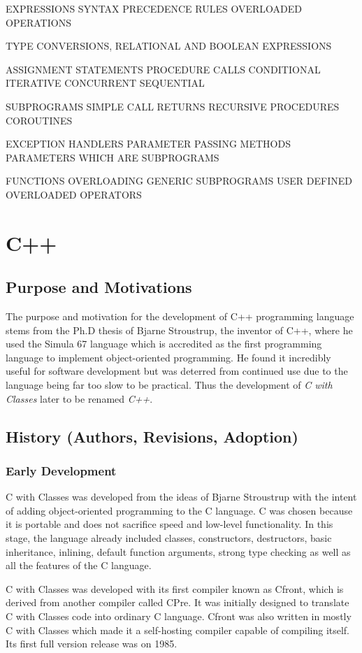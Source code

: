 \documentclass[12pt]{article}
\begin{document}
EXPRESSIONS
SYNTAX
PRECEDENCE RULES
OVERLOADED OPERATIONS

TYPE CONVERSIONS, RELATIONAL AND BOOLEAN EXPRESSIONS

ASSIGNMENT STATEMENTS
PROCEDURE CALLS
CONDITIONAL
ITERATIVE
CONCURRENT
SEQUENTIAL

SUBPROGRAMS
SIMPLE CALL RETURNS
RECURSIVE PROCEDURES
COROUTINES

EXCEPTION HANDLERS
PARAMETER PASSING METHODS
PARAMETERS WHICH ARE SUBPROGRAMS

FUNCTIONS OVERLOADING
GENERIC SUBPROGRAMS
USER DEFINED OVERLOADED OPERATORS

\fi


\section{C++}
\subsection{Purpose and Motivations}
The purpose and motivation for the development of C++ programming language stems from the Ph.D thesis of Bjarne Stroustrup, the
inventor of C++, where he used the Simula 67 language which is accredited as the first programming language to implement 
object-oriented programming. He found it incredibly useful for software development but was deterred from continued use
due to the language being far too slow to be practical. Thus the development of \textit{C with Classes} later to be renamed \textit{C++}.
\subsection{History (Authors, Revisions, Adoption)}
\subsubsection{Early Development}
C with Classes was developed from the ideas of Bjarne Stroustrup with the intent of adding object-oriented programming to the C language. C was chosen because it is portable and does not sacrifice speed and low-level functionality. In this stage, the language already included classes, constructors, destructors, basic inheritance, inlining, default function arguments, strong type checking as well as all the features of the C language.

C with Classes was developed with its first compiler known as Cfront, which is derived from another compiler called CPre. It was initially designed to translate C with Classes code into ordinary C language. Cfront was also written in mostly C with Classes which made it a self-hosting compiler capable of compiling itself. Its first full version release was on 1985.
\end{document}
